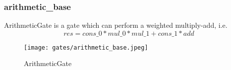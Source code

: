 \subsubsection{arithmetic\_base}

ArithmeticGate is a gate which can perform a weighted multiply-add, i.e.
\[res = cons\_0 * mul\_0 * mul\_1 + cons\_1 * add\]



\begin{figure}[!ht]
    \centering
    \texttt{[image: gates/arithmetic\_base.jpeg]}
    \caption{ArithmeticGate}
    \label{fig:arthmetic-gate}
\end{figure}